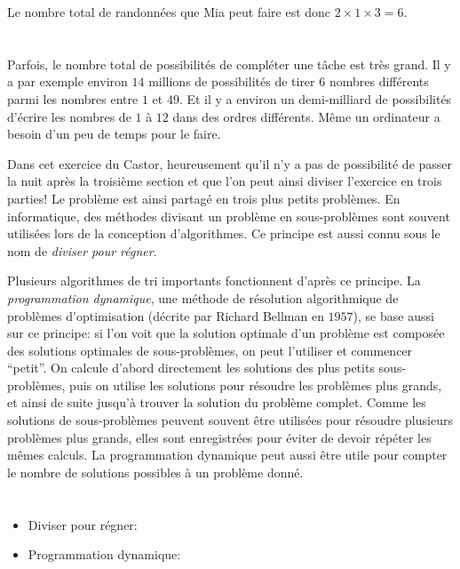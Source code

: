 {{Le nombre total de randonnées que Mia peut faire est donc ${2 \times 1 \times 3 = 6}$.



\section*{\BrochureItsInformatics}
Parfois, le nombre total de possibilités de compléter une tâche est très grand. Il y a par exemple environ $14$ millions de possibilités de tirer $6$ nombres différents parmi les nombres entre $1$ et $49$. Et il y a environ un demi-milliard de possibilités d’écrire les nombres de $1$ à $12$ dans des ordres différents. Même un ordinateur a besoin d’un peu de temps pour le faire.

Dans cet exercice du Castor, heureusement qu’il n’y a pas de possibilité de passer la nuit après la troisième section et que l’on peut ainsi diviser l’exercice en trois parties! Le problème est ainsi partagé en trois plus petits problèmes. En informatique, des méthodes divisant un problème en sous-problèmes sont souvent utilisées lors de la conception d’algorithmes. Ce principe est aussi connu sous le nom de \emph{diviser pour régner}.

Plusieurs algorithmes de tri importants fonctionnent d’après ce principe. La \emph{programmation dynamique}, une méthode de résolution algorithmique de problèmes d’optimisation (décrite par Richard Bellman en $1957$), se base aussi sur ce principe: si l’on voit que la solution optimale d’un problème est composée des solutions optimales de sous-problèmes, on peut l’utiliser et commencer “petit”. On calcule d’abord directement les solutions des plus petits sous-problèmes, puis on utilise les solutions pour résoudre les problèmes plus grands, et ainsi de suite jusqu’à trouver la solution du problème complet. Comme les solutions de sous-problèmes peuvent souvent être utilisées pour résoudre plusieurs problèmes plus grands, elles sont enregistrées pour éviter de devoir répéter les mêmes calculs. La programmation dynamique peut aussi être utile pour compter le nombre de solutions possibles à un problème donné.



\section*{\BrochureWebsitesAndKeywords}
{\raggedright
\begin{itemize}
  \item Diviser pour régner: \href{https://fr.wikipedia.org/wiki/Diviser_pour_r\%C3\%A9gner_(informatique)}{}
  \item Programmation dynamique: \href{https://fr.wikipedia.org/wiki/Programmation_dynamique}{}
\end{itemize}


}}}
